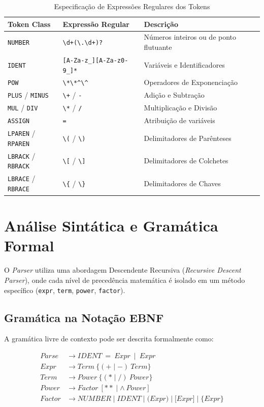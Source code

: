 \documentclass[12pt,a4paper]{article}
\begin{document}
\begin{table}[h!]
\centering
\caption{Especificação de Expressões Regulares dos Tokens}
\begin{tabular}{lll}
\toprule
\textbf{Token Class} & \textbf{Expressão Regular} & \textbf{Descrição} \\
\midrule
\texttt{NUMBER} & \verb|\d+(\.\d+)?| & Números inteiros ou de ponto flutuante \\
\texttt{IDENT} & \verb|[A-Za-z_][A-Za-z0-9_]*| & Variáveis e Identificadores \\
\texttt{POW} & \verb|\*\*|\verb|^\^| & Operadores de Exponenciação \\
\texttt{PLUS} / \texttt{MINUS} & \verb|\+| / \verb|-| & Adição e Subtração \\
\texttt{MUL} / \texttt{DIV} & \verb|\*| / \verb|/| & Multiplicação e Divisão \\
\texttt{ASSIGN} & \verb|=| & Atribuição de variáveis \\
\texttt{LPAREN} / \texttt{RPAREN} & \verb|\(| / \verb|\)| & Delimitadores de Parênteses \\
\texttt{LBRACK} / \texttt{RBRACK} & \verb|\[| / \verb|\]| & Delimitadores de Colchetes \\
\texttt{LBRACE} / \texttt{RBRACE} & \verb|\{| / \verb|\}| & Delimitadores de Chaves \\
\bottomrule
\end{tabular}
\end{table}

\section{Análise Sintática e Gramática Formal}
O \textit{Parser} utiliza uma abordagem Descendente Recursiva (\textit{Recursive Descent Parser}), onde cada nível de precedência matemática é isolado em um método específico (\texttt{expr}, \texttt{term}, \texttt{power}, \texttt{factor}).

\subsection{Gramática na Notação EBNF}
A gramática livre de contexto pode ser descrita formalmente como:

\begin{align*}
\mathit{Parse} &\rightarrow \mathit{IDENT} \ \mathbf{=} \ \mathit{Expr} \ \mid \ \mathit{Expr} \\
\mathit{Expr} &\rightarrow \mathit{Term} \ \{ (\mathbf{+} \mid \mathbf{-}) \ \mathit{Term} \} \\
\mathit{Term} &\rightarrow \mathit{Power} \ \{ (\mathbf{*} \mid \mathbf{/}) \ \mathit{Power} \} \\
\mathit{Power} &\rightarrow \mathit{Factor} \ [ \mathbf{**} \mid \mathbf{\wedge} \ \mathit{Power} ] \\
\mathit{Factor} &\rightarrow \mathit{NUMBER} \mid \mathit{IDENT} \mid \mathbf{(}\mathit{Expr}\mathbf{)} \mid \mathbf{[}\mathit{Expr}\mathbf{]} \mid \mathbf{\{}\mathit{Expr}\mathbf{\}}
\end{align*}
\end{document}
